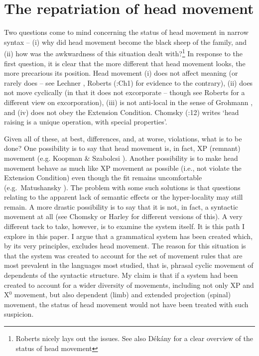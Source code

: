 \documentclass[output=paper,colorlinks,citecolor=brown,
]{langscibook}
\begin{document}
\section{The repatriation of head movement}

Two questions come to mind concerning the status of head movement in narrow syntax -- (i) why did head movement become the black sheep of the family, and (ii) how was the awkwardness of this situation dealt with?\footnote{Roberts \citeyearpar{Roberts:2010} nicely lays out the issues. See also D\'ek\'any \citeyearpar{Dekany:2018} for a clear overview of the status of head movement}   In response to the first question, it is clear that the more different that head movement looks, the more precarious its position.  Head movement (i) does not affect meaning (or rarely does -- see Lechner \citeyearpar{Lechner:2006}, Roberts (\citeyear{Roberts:2010}:Ch1) for evidence to the contrary), (ii) does not move cyclically (in that it does not excorporate -- though see Roberts \citeyearpar{Roberts:2010} for a different view on excorporation), (iii) is not anti-local in the sense of Grohmann \citeyearpar{Grohmann:2003b}, and (iv)  does not obey the Extension Condition.  Chomsky (\citeyear{Chomsky:2015}:12) writes `head raising is a unique operation, with special properties'. 

Given all of these, at best, differences, and, at worse, violations, what is to be done?  One possibility is to say that head movement is, in fact, XP (remnant) movement (e.g. Koopman \& Szabolcsi \citeyear{Koopman:2000}).  Another possibility is to make head movement behave as much like XP movement as possible (i.e., not violate the Extension Condition) even though the fit remains uncomfortable (e.g.\ Matushansky \citeyear{Matushansky:2006}).  The problem with some such solutions is that questions relating to the apparent lack of semantic effects or the hyper-locality  may still remain.  A more drastic possibility is to say that it is not, in fact, a syntactic movement at all (see Chomsky \citeyear{Chomsky:2001a} or Harley \citeyearpar{Harley:2003a} for different versions of this).  A very different tack to take, however, is to examine the system itself.   It is this path I explore in this paper.  I argue that a grammatical system has been created which, by its very principles, excludes head movement.  The reason for this situation is that the system was created to account for the set of movement rules that are most prevalent in the languages most studied, that is, phrasal cyclic movement of dependents of the syntactic structure.  My claim is that if a system had been created to account for a wider diversity of movements, including not only XP and X$^0$ movement, but also dependent (limb)  and extended projection (spinal) movement, the status of head movement would not have been treated with such suspicion. 
\end{document}
